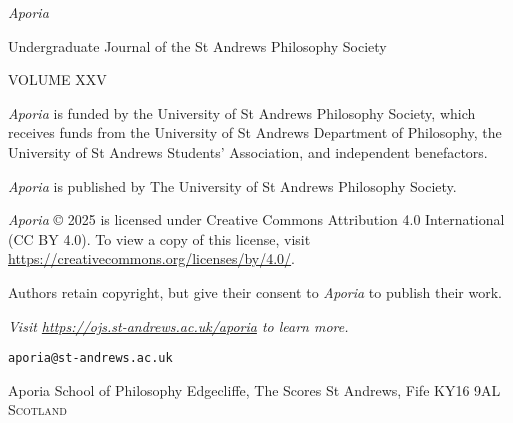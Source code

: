 \thispagestyle{empty}

\noindent
{\huge\textit{Aporia}}

\vspace{1cm}

\normalsize
\noindent Undergraduate Journal of the St Andrews Philosophy
Society

\vspace{1cm}
\noindent VOLUME XXV


\vspace{3cm}
\vfill

\noindent \textit{Aporia} is funded by the University of St
Andrews Philosophy Society, which receives funds from the
University of St Andrews
Department of Philosophy, the University of St Andrews
Students’ Association, and independent benefactors.

\noindent
\textit{Aporia} is published by The University of St Andrews
Philosophy Society.

\vspace{1cm}
\noindent
\textit{Aporia} © 2025 is licensed under Creative Commons
Attribution 4.0 International (CC BY 4.0). To view a copy of
this license, visit
\url{https://creativecommons.org/licenses/by/4.0/}.

\vspace{1cm}
\noindent
Authors retain copyright, but give their consent to
\textit{Aporia} to publish their work.

\vspace{2cm}
\begin{multicols}{2}
\noindent
\textit{Visit \url{https://ojs.st-andrews.ac.uk/aporia} to learn more.}

\columnbreak
\noindent
\texttt{aporia@st-andrews.ac.uk}

\vspace{1cm}
\noindent
Aporia\newline
School of Philosophy\newline
Edgecliffe, The Scores\newline
St Andrews, Fife\newline
KY16 9AL\newline
\textsc{Scotland}
\end{multicols}
